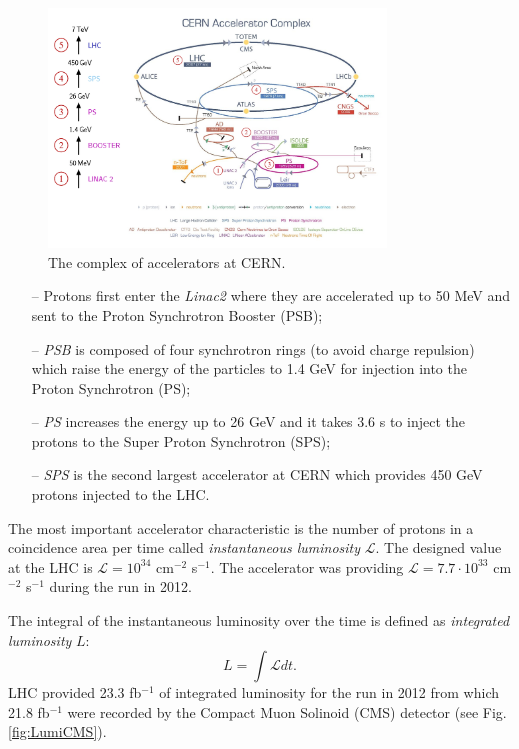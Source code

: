 \begin{figure}[t]
  \centering
  \includegraphics[width=0.8\textwidth]{02_experimental_setup/plots/Cern-Accelerator-Complex-2.png}
  \caption{The complex of accelerators at CERN.}
  \label{fig:AccelCERN}
\end{figure}

\begin{itemize}
 \item[--] Protons first enter the \textit{Linac2} \cite{Arnaudon:1004186} where they are accelerated up to 50 MeV and sent to the Proton Synchrotron Booster (PSB);
 \item[--] \textit{PSB}\cite{Benedikt:2000bs} is composed of four synchrotron rings (to avoid charge repulsion) which raise the energy of the particles to 1.4 GeV
 for injection into the Proton Synchrotron (PS);
 \item[--] \textit{PS}\cite{Benedikt:2000bs} increases the energy up to 26 GeV and it takes 3.6 s to inject the protons to the Super Proton Synchrotron (SPS); 
 \item[--] \textit{SPS}\cite{Benedikt:2000bs} is the second largest accelerator at CERN which provides 450 GeV protons injected to the LHC.
\end{itemize}

The most important accelerator characteristic is the number of protons 
in a coincidence area per time called \textit{instantaneous luminosity} $\mathcal{L}$. The designed value 
at the LHC is $\mathcal{L} = 10^{34}$ cm$^{-2}$ s$^{-1}$. The accelerator was providing $\mathcal{L} = 7.7 \cdot 10^{33}$ cm$^{-2}$ s$^{-1}$
during the run in 2012.

The integral of the instantaneous luminosity over the time
is defined as \textit{integrated luminosity} $L$: 
\begin{equation}\label{eq:lumi}
  L  = \int\mathcal{L}dt.
\end{equation}
LHC provided 23.3 fb$^{-1}$ of integrated luminosity for the run in 2012 from which 21.8 fb$^{-1}$ were
recorded by the Compact Muon Solinoid (CMS) detector (see Fig.\ref{fig:LumiCMS}).

